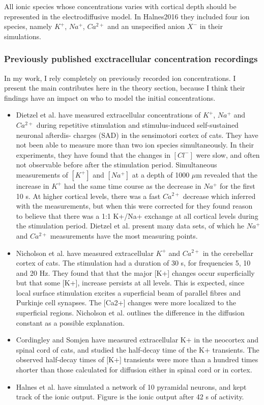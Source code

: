 \documentclass{article}
\begin{document}
All ionic species whose concentrations varies with cortical depth should be represented in the electrodiffusive model. In Halnes2016 they included four ion species, namely $K^+$, $Na^+$, $Ca^{2+}$ and an unspecified anion $X^-$ in their simulations.

\subsubsection{Previously published exctracellular concentration recordings}
In my work, I rely completely on previously recorded ion concentrations. I present the main contributes here in the theory section, because I think their findings have an impact on who to model the initial concentrations. 

\begin{itemize}
\item Dietzel et al. have measured extracellular concentrations of $K^+$, $Na^+$ and $Ca^{2+}$ during repetitive stimulation and stimulus-induced self-sustained neuronal afterdis-
charges (SAD) in the sensimotori cortex of cats. They have not been able to measure more than two ion species simultaneously. In their experiments, they have found that the changes in $[Cl^-]$ were slow, and often not observable before after the stimulation period. Simultaneous measurements of $[K^+]$ and $[Na^+]$ at a depth of 1000 $\mu$m revealed that the increase in $K^+$ had the same time course as the decrease in $Na^+$ for the first 10 s. At higher cortical levels, there was a fast $Ca^{2+}$ decrease which inferred with the measurements, but when this were corrected for they found reason to believe that there was a 1:1 K+/Na+ exchange at all cortical levels during the stimulation period. Dietzel et al. present many data sets, of which he $Na^+$ and $Ca^{2+}$ measurements have the most measuring points. 

\item Nicholson et al. have measured extracellular $K^+$ and $Ca^{2+}$ in the cerebellar cortex of cats. The stimulation had a duration of 30 s, for frequencies 5, 10 and 20 Hz. They found that that the major [K+] changes occur superficially but that some [K+], increase persists at all levels. This is expected, since local surface stimulation excites a superficial beam of parallel fibres and Purkinje cell synapses. The [Ca2+] changes were more localized to the superficial regions. Nicholson et al. outlines the difference in the diffusion constant as a possible explanation.

\item Cordingley and Somjen have measured extracellular K+ in the neocortex and spinal cord of cats, and studied the half-decay time of the K+ transients. The observed half-decay times of
[K+] transients were more than a hundred times shorter than those calculated for
diffusion either in spinal cord or in cortex. 

\item Halnes et al. have simulated a network of 10 pyramidal neurons, and kept track of the ionic output. Figure is the ionic output after 42 s of activity. 
\end{itemize}
\end{document}
